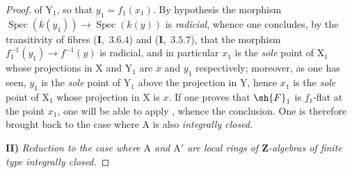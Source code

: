 \begin{proof}
of $\mathrm{Y}_1$, so that $y_1=f_1(x_1)$. By hypothesis the morphism $\operatorname{Spec}(k(y_1))\to\operatorname{Spec}(k(y))$
is \emph{radicial}, whence one concludes, by the transitivity of fibres (\textbf{I},~$3.6.4$) and (\textbf{I},~$3.5.7$), that
the morphism $f_1^{-1}(y_1)\to f^{-1}(y)$ is radicial, and in particular $x_1$ is the \emph{sole} point of $\mathrm{X}_1$
whose projections in $\mathrm{X}$ and $\mathrm{Y}_1$ are $x$ and $y_1$ respectively; moreover, as one has seen, $y_1$
is the \emph{sole} point of $\mathrm{Y}_1$ above the projection in $\mathrm{Y}$, hence $x_1$ is the \emph{sole} point of $\mathrm{X}_1$
whose projection in $\mathrm{X}$ is $x$. If one proves that $\sh{F}_1$ is $f_1$-flat at the point $x_1$, one will be able to
apply , whence the conclusion. One is therefore brought back to the case where $\mathrm{A}$
is also \emph{integrally closed}.

\medskip
\noindent\textbf{II)} \emph{Reduction to the case where $\mathrm{A}$ and $\mathrm{A}'$ are local rings of $\mathbf{Z}$-algebras of finite type integrally
closed.}


\end{proof}
